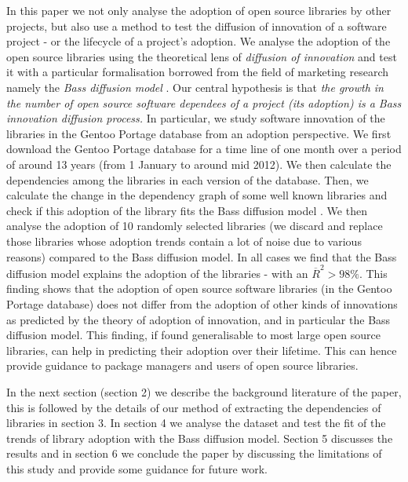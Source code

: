 \documentclass[smallextended,final]{svjour3}
\begin{document}
In this paper we not only analyse the adoption of open source libraries by other projects, but also use a method to test the diffusion of innovation of a software project - or the lifecycle of a project's adoption. We analyse the adoption of the open source libraries using the theoretical lens of \emph{diffusion of innovation} \citep{rogers03} and test it with a particular formalisation borrowed from the field of marketing research namely the \emph{Bass diffusion model} \citep{bass69}. Our central hypothesis is that  \emph{the growth in the number of open source software dependees of a project (its adoption) is a Bass innovation diffusion process.} In particular, we study  software innovation of the libraries in the Gentoo Portage  database from an adoption perspective. We first download the Gentoo Portage database for a time line of one month over a period of around 13 years (from 1 January to around mid 2012). We then calculate the dependencies among the libraries in each version of the database. Then, we calculate the change in the dependency graph of some well known libraries and check if this adoption of the library fits the Bass diffusion model \citep{bass69}.  We then analyse the adoption of 10 randomly selected libraries (we discard and replace those libraries whose adoption trends contain a lot of noise due to various reasons) compared to the Bass diffusion model. In all cases we find that the Bass diffusion model explains the adoption of the libraries - with an $\overline{R}^2 > 98\%$. This finding shows that the adoption of open source software libraries (in the Gentoo Portage database) does not differ from the adoption of other kinds of innovations as predicted by the theory of adoption of innovation, and in particular the Bass diffusion model. This finding, if found generalisable to most large open source libraries, can help in predicting their adoption over their lifetime. This can hence provide guidance to package managers and users of open source libraries.



In the next section (section 2)  we describe the background literature of the paper, this is followed by the details of our method of extracting the dependencies of libraries in section 3. In section 4 we analyse the dataset and test the fit of the trends of library adoption with the Bass diffusion model. Section 5 discusses the results and in section 6 we conclude the paper by discussing the limitations of this study and provide some guidance for future work.
 
\end{document}
